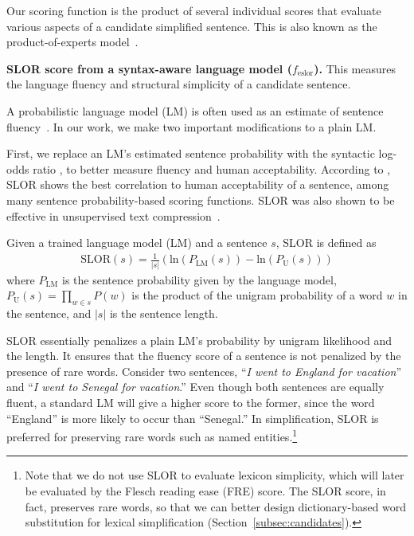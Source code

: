 \documentclass[11pt,a4paper]{article}
\begin{document}
Our scoring function is the product of several individual scores that evaluate various aspects of a candidate simplified sentence. This is also known as the product-of-experts model~\cite{hinton2002training}.



\textbf{SLOR score from a syntax-aware language model (}$f_{\operatorname{eslor}}$\textbf{).}
This measures the {language fluency} and {structural simplicity} of a candidate sentence.

A probabilistic language model (LM) is often used as an estimate of sentence fluency~\cite{miao2019cgmh}.
In our work, we make two important modifications to a plain LM.


First, we replace an LM's estimated sentence probability with the syntactic log-odds ratio \cite[SLOR,][]{pauls2012large}, to better measure fluency and human acceptability.
According to , SLOR shows the best correlation to human acceptability of a sentence, among many sentence probability-based scoring functions. SLOR was also shown to be effective in unsupervised text compression~\cite{kann2018sentence}.

Given a trained language model (LM) and a sentence $s$, SLOR is defined as 
\begin{equation}
\begin{split}
        \mathrm{SLOR}(s) = \frac{1}{|s|}(\mathrm{ln}(P_\mathrm{LM}(s)) - \mathrm{ln}(P_\mathrm{U}(s)))
\end{split}
\end{equation}
where $P_{\operatorname{LM}}$ is the sentence probability given by the language model, $P_{\operatorname{U}}(s)=\prod_{w\in s}P(w)$ is the product of the unigram probability of a word $w$ in the sentence, and $|s|$ is the sentence length.


SLOR essentially penalizes a plain LM's probability by unigram likelihood and the length. 
It ensures that the fluency score of a sentence is not penalized by the presence of rare words. Consider two sentences, ``\textit{I went to England for vacation}'' and ``\textit{I went to Senegal for vacation}.'' Even though both sentences are equally fluent, a standard LM will give a higher score to the former, since the word ``England'' is more likely to occur than ``Senegal.''
In simplification, SLOR is preferred for preserving rare words such as named entities.\footnote{Note that we do not use SLOR to evaluate lexicon simplicity, which will later be evaluated by the Flesch reading ease (FRE) score. The SLOR score, in fact, preserves rare words, so that we can better design dictionary-based word substitution for lexical simplification (Section~\ref{subsec:candidates}).}
\end{document}
